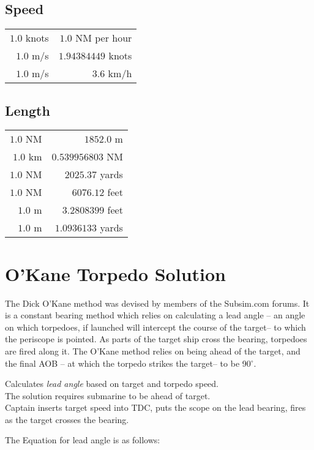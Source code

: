 \documentclass{article}
\newcommand{\degree}{$^{\circ}$}
\begin{document}
\subsection{Speed}
\begin{center}
\begin{tabular}{r | r}
$1.0$ knots & $1.0$ NM per hour\\
$1.0$ m/s & $1.94384449$ knots\\
$1.0$ m/s & $3.6$ km/h\\
\end{tabular}
\end{center}

\subsection{Length}
\begin{center}
\begin{tabular}{r | r}
$1.0$ NM & $1852.0$ m\\
$1.0$ km & $0.539956803$ NM\\
$1.0$ NM & $2025.37$ yards\\
$1.0$ NM & $6076.12$ feet\\
$1.0$ m & $3.2808399$ feet\\
$1.0$ m & $1.0936133$ yards\\
\end{tabular}
\end{center}

\section{O'Kane Torpedo Solution}
The Dick O'Kane method was devised by members of the Subsim.com forums. It is a constant bearing method which relies on calculating a lead angle -- an angle on which torpedoes, if launched will intercept the course of the target-- to which the periscope is pointed. As parts of the target ship cross the bearing, torpedoes are fired along it. The O'Kane method relies on being ahead of the target, and the final AOB -- at which the torpedo strikes the target-- to be 90\degree .

Calculates \emph{lead angle} based on target and torpedo speed.\\
The solution requires submarine to be ahead of target.\\
Captain inserts target speed into TDC, puts the scope on the lead bearing, fires as the target crosses the bearing.

The Equation for lead angle is as follows:
\end{document}
